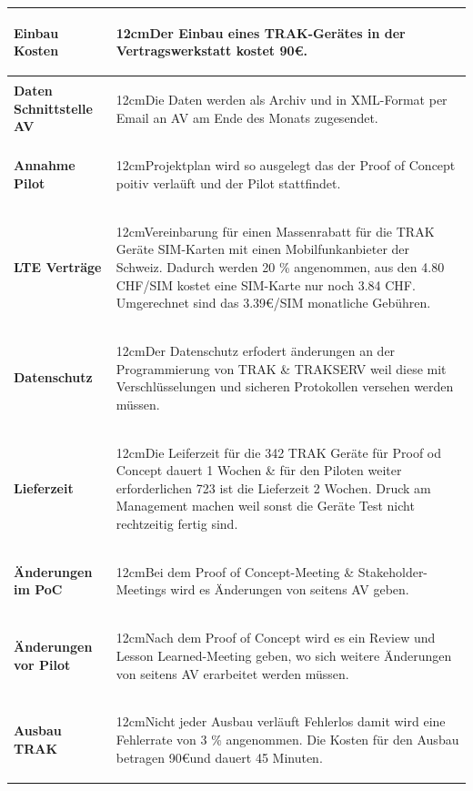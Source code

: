 \documentclass[a4paper,10pt]{scrartcl}
\newcommand\Absatz[2][12cm]{\begin{varwidth}{#1}\flushleft#2\end{varwidth}}
\begin{document}
\begin{adjustbox}{width=\textwidth}
\begin{tabular}{ll}
\textbf{Einbau Kosten}  & {\Absatz{Der Einbau eines TRAK-Gerätes in der Vertragswerkstatt kostet 90\euro. \linebreak}} \\
\midrule
\textbf{Daten Schnittstelle AV}  & {\Absatz{Die Daten werden als Archiv und in XML-Format per Email an AV am Ende des Monats zugesendet.\linebreak}} \\
\midrule
\textbf{Annahme Pilot}  & {\Absatz{Projektplan wird so ausgelegt das der Proof of Concept poitiv verlaüft und der Pilot stattfindet.\linebreak}} \\
\midrule
\textbf{LTE Verträge}  & {\Absatz{Vereinbarung für einen Massenrabatt für die TRAK Geräte SIM-Karten mit einen Mobilfunkanbieter der Schweiz. Dadurch werden 20 \% angenommen, aus den 4.80 CHF/SIM kostet eine SIM-Karte nur noch 3.84 CHF. Umgerechnet sind das 3.39\euro /SIM monatliche Gebühren.\linebreak}} \\
\midrule
\textbf{Datenschutz}  & {\Absatz{Der Datenschutz erfodert änderungen an der Programmierung von TRAK \& TRAKSERV weil diese mit Verschlüsselungen und sicheren Protokollen versehen werden müssen.\linebreak}} \\
\midrule
\textbf{Lieferzeit}  & {\Absatz{Die Leiferzeit für die 342 TRAK Geräte für Proof od Concept dauert 1 Wochen \& für den Piloten weiter erforderlichen 723 ist die Lieferzeit 2 Wochen. Druck am Management machen weil sonst die Geräte Test nicht rechtzeitig fertig sind.\linebreak}} \\
\midrule
\textbf{Änderungen im PoC}  & {\Absatz{Bei dem Proof of Concept-Meeting \& Stakeholder-Meetings wird es Änderungen von seitens AV geben. \linebreak}} \\
\midrule
\textbf{Änderungen vor Pilot}  & {\Absatz{Nach dem Proof of Concept wird es ein Review und Lesson Learned-Meeting geben, wo sich weitere Änderungen von seitens AV erarbeitet werden müssen.
\linebreak}} \\
\midrule
\textbf{Ausbau TRAK}  & {\Absatz{Nicht jeder Ausbau verläuft Fehlerlos damit wird eine Fehlerrate von 3 \% angenommen. Die Kosten für den Ausbau betragen 90\euro und dauert 45 Minuten.
\linebreak}} \\
\bottomrule
\end{tabular}
\end{adjustbox}
\pagebreak
\end{document}
